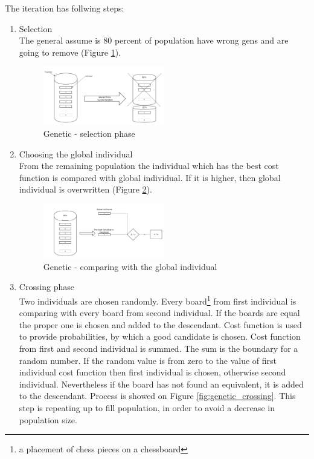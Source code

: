 \documentclass[pdftex]{article}
\begin{document}
The iteration has follwing steps:

\begin{enumerate}
 	\item Selection \hfill \\
		The general assume is 80 percent of population have wrong gens and are going to remove (Figure \ref{fig:genetic_selection}).
		
\begin{figure}[!htb]
	\centering
	\includegraphics[width=0.5\textwidth]{genetic/genetic_selection.png} 
	\caption{Genetic - selection phase}
	\label{fig:genetic_selection}
\end{figure}

	\item Choosing the global individual \hfill \\
		From the remaining population the individual which has the best cost function is compared with global individual. If it is higher, then global individual is overwritten (Figure \ref{fig:genetic_global}).

\begin{figure}[!htb]
	\centering
	\includegraphics[width=0.5\textwidth]{genetic/genetic_global.png} 
	\caption{Genetic - comparing with the global individual}
	\label{fig:genetic_global}
\end{figure}
\newpage
	\item Crossing phase \hfill \\
		Two individuals are chosen randomly. Every board\footnote{a placement of chess pieces on a chessboard} from first individual is comparing with every board from second individual. If the boards are equal the proper one is chosen and added to the descendant. Cost function is used to provide probabilities, by which a good candidate is chosen. Cost function from first and second individual is summed. The sum is the boundary for a random number. If the random value is from zero to the value of first individual cost function then first individual is chosen, otherwise second individual. Nevertheless if the board has not found an equivalent, it is added to the descendant. Process is showed on Figure \ref{fig:genetic_crossing}. This step is repeating up to fill population, in order to avoid a decrease in population size.

\end{enumerate}
\end{document}
